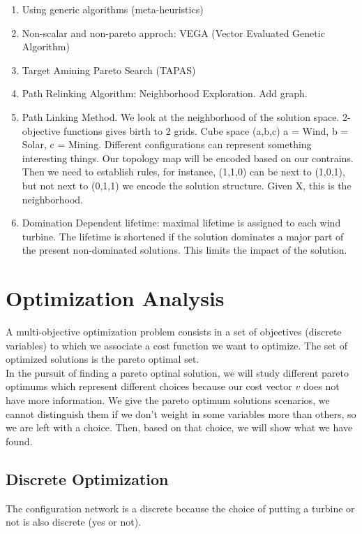 \documentclass[12pt]{article}
\begin{document}
\begin{enumerate}
\item Using generic algorithms (meta-heuristics)
\item Non-scalar and non-pareto approch: VEGA (Vector Evaluated Genetic Algorithm)
\item Target Amining Pareto Search (TAPAS)
\item Path Relinking Algorithm: Neighborhood Exploration. Add graph.
\item  Path Linking Method. We look at the neighborhood of the solution space. 2-objective functions gives birth to 2 grids. Cube space (a,b,c) a = Wind, b = Solar, c = Mining. Different configurations can represent something interesting things. Our topology map will be encoded based on our contrains. Then we need to establish rules, for instance, (1,1,0) can be next to (1,0,1), but not next to (0,1,1) we encode the solution structure. Given X, this is the neighborhood.  
\item Domination Dependent lifetime: maximal lifetime is assigned to each wind turbine. The lifetime is shortened if the solution dominates a major part of the present non-dominated solutions. This limits the impact of the solution. 
\end{enumerate}

\section{Optimization Analysis}

A multi-objective optimization problem consists in a set of objectives (discrete variables) to which we associate a cost function we want to optimize. The set of optimized solutions is the pareto optimal set. \\

In the pursuit of finding a pareto optinal solution, we will study different pareto optimums which represent different choices because our cost vector  $v$ does not have more information. We give the pareto optimum solutions scenarios, we cannot distinguish them if we don't weight in some variables more than others, so we are left with a choice. Then, based on that choice, we will show what we have found. \\

\subsection{Discrete Optimization}
The configuration network is a discrete because the choice of putting a turbine or not is also
discrete (yes or not). \\
\end{document}
